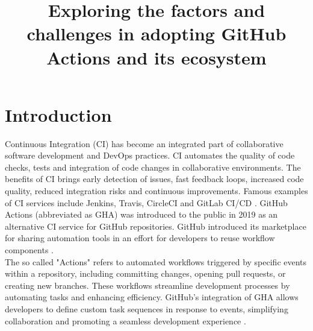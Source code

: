 \documentclass[conference]{IEEEtran}
\begin{document}
\title{Exploring the factors and challenges in adopting GitHub Actions and its ecosystem\\}

\author{
\and
{}
}

\maketitle

\section{Introduction}
    Continuous Integration (CI) has become an integrated part of collaborative software development and DevOps practices. CI automates the quality of code checks, tests and integration of code changes in collaborative environments. The benefits of CI brings early detection of issues, fast feedback loops, increased code quality, reduced integration risks and continuous improvements. Famous examples of CI services include Jenkins, Travis, CircleCI and GitLab CI/CD \cite{dabbish2012social}. GitHub Actions (abbreviated as GHA) was introduced to the public in 2019 as an alternative CI service for GitHub repositories. GitHub introduced its marketplace for sharing automation tools in an effort for developers to reuse workflow components \cite{saroar2023developers}. \\ 

    The so called "Actions" refers to automated workflows triggered by specific events within a repository, including committing changes, opening pull requests, or creating new branches. These workflows streamline development processes by automating tasks and enhancing efficiency. GitHub's integration of GHA allows developers to define custom task sequences in response to events, simplifying collaboration and promoting a seamless development experience \cite{chandrasekara2021getting}. \\
\end{document}
